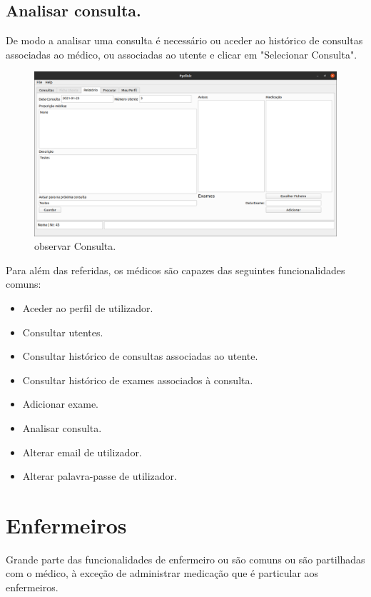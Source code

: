 \documentclass[11pt,a4paper,twoside]{article}
\begin{document}
\subsection{Analisar consulta.}
De modo a analisar uma consulta é necessário ou aceder ao histórico de consultas associadas ao médico, ou associadas ao utente e clicar em "Selecionar Consulta".\\

\begin{figure}[H]
	\centering
	\includegraphics[width=0.9\linewidth]{image/medico/relatorio1.png}
	\caption{observar Consulta.}
	\label{fig:verconsulta}
\end{figure}

Para além das referidas, os médicos são capazes das seguintes funcionalidades comuns:

\begin{itemize}
	\item Aceder ao perfil de utilizador.
	\item Consultar utentes.
	\item Consultar histórico de consultas associadas ao utente.
	\item Consultar histórico de exames associados à consulta.
	\item Adicionar exame.
	\item Analisar consulta.
	\item Alterar email de utilizador.
	\item Alterar palavra-passe de utilizador.
\end{itemize}


\section{Enfermeiros}
	
	Grande parte das funcionalidades de enfermeiro ou são comuns ou são partilhadas com o médico, à exceção de administrar medicação que é particular aos enfermeiros.
	
\end{document}
